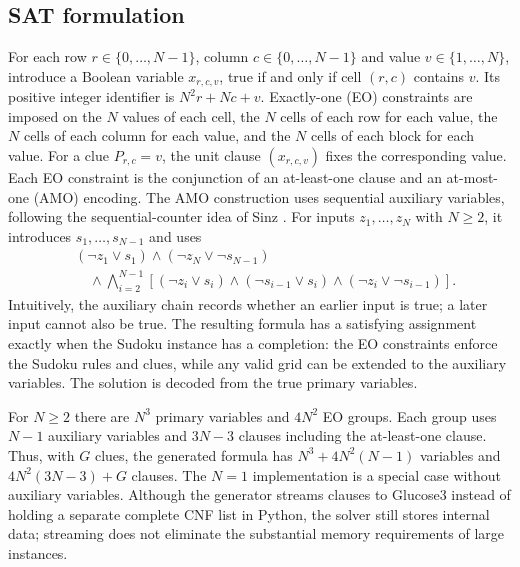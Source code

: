\documentclass[a4paper,fleqn]{cas-sc}
\begin{document}
\subsection{SAT formulation}
For each row \(r\in\{0,\ldots,N-1\}\), column \(c\in\{0,\ldots,N-1\}\) and value \(v\in\{1,\ldots,N\}\), introduce a Boolean variable \(x_{r,c,v}\), true if and only if cell \((r,c)\) contains \(v\). Its positive integer identifier is \(N^2r+Nc+v\). Exactly-one (EO) constraints are imposed on the \(N\) values of each cell, the \(N\) cells of each row for each value, the \(N\) cells of each column for each value, and the \(N\) cells of each block for each value.
For a clue \(P_{r,c}=v\), the unit clause \((x_{r,c,v})\) fixes the corresponding value. Each EO constraint is the conjunction of an at-least-one clause and an at-most-one (AMO) encoding. The AMO construction uses sequential auxiliary variables, following the sequential-counter idea of Sinz \cite{sinz}. For inputs \(z_1,\ldots,z_N\) with \(N\ge2\), it introduces \(s_1,\ldots,s_{N-1}\) and uses
\begin{align}
 &(\neg z_1\lor s_1)\land(\neg z_N\lor\neg s_{N-1})\\
 &\quad\land\bigwedge_{i=2}^{N-1}[(\neg z_i\lor s_i)\land(\neg s_{i-1}\lor s_i)\land(\neg z_i\lor\neg s_{i-1})].
\end{align}
Intuitively, the auxiliary chain records whether an earlier input is true; a later input cannot also be true. The resulting formula has a satisfying assignment exactly when the Sudoku instance has a completion: the EO constraints enforce the Sudoku rules and clues, while any valid grid can be extended to the auxiliary variables. The solution is decoded from the true primary variables.

For \(N\ge2\) there are \(N^3\) primary variables and \(4N^2\) EO groups. Each group uses \(N-1\) auxiliary variables and \(3N-3\) clauses including the at-least-one clause. Thus, with \(G\) clues, the generated formula has \(N^3+4N^2(N-1)\) variables and \(4N^2(3N-3)+G\) clauses. The \(N=1\) implementation is a special case without auxiliary variables. Although the generator streams clauses to Glucose3 instead of holding a separate complete CNF list in Python, the solver still stores internal data; streaming does not eliminate the substantial memory requirements of large instances.
\end{document}
